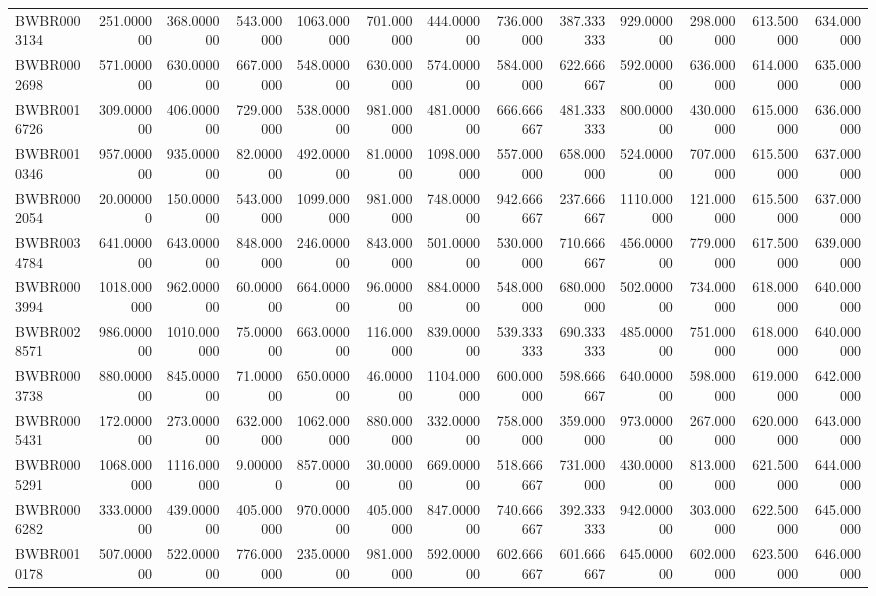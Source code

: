 \begin{longtable}{lrrrrrrrrrrrr}
BWBR0003134 & 251.000000 & 368.000000 & 543.000000 & 1063.000000 & 701.000000 & 444.000000 & 736.000000 & 387.333333 & 929.000000 & 298.000000 & 613.500000 & 634.000000 \\
BWBR0002698 & 571.000000 & 630.000000 & 667.000000 & 548.000000 & 630.000000 & 574.000000 & 584.000000 & 622.666667 & 592.000000 & 636.000000 & 614.000000 & 635.000000 \\
BWBR0016726 & 309.000000 & 406.000000 & 729.000000 & 538.000000 & 981.000000 & 481.000000 & 666.666667 & 481.333333 & 800.000000 & 430.000000 & 615.000000 & 636.000000 \\
BWBR0010346 & 957.000000 & 935.000000 & 82.000000 & 492.000000 & 81.000000 & 1098.000000 & 557.000000 & 658.000000 & 524.000000 & 707.000000 & 615.500000 & 637.000000 \\
BWBR0002054 & 20.000000 & 150.000000 & 543.000000 & 1099.000000 & 981.000000 & 748.000000 & 942.666667 & 237.666667 & 1110.000000 & 121.000000 & 615.500000 & 637.000000 \\
BWBR0034784 & 641.000000 & 643.000000 & 848.000000 & 246.000000 & 843.000000 & 501.000000 & 530.000000 & 710.666667 & 456.000000 & 779.000000 & 617.500000 & 639.000000 \\
BWBR0003994 & 1018.000000 & 962.000000 & 60.000000 & 664.000000 & 96.000000 & 884.000000 & 548.000000 & 680.000000 & 502.000000 & 734.000000 & 618.000000 & 640.000000 \\
BWBR0028571 & 986.000000 & 1010.000000 & 75.000000 & 663.000000 & 116.000000 & 839.000000 & 539.333333 & 690.333333 & 485.000000 & 751.000000 & 618.000000 & 640.000000 \\
BWBR0003738 & 880.000000 & 845.000000 & 71.000000 & 650.000000 & 46.000000 & 1104.000000 & 600.000000 & 598.666667 & 640.000000 & 598.000000 & 619.000000 & 642.000000 \\
BWBR0005431 & 172.000000 & 273.000000 & 632.000000 & 1062.000000 & 880.000000 & 332.000000 & 758.000000 & 359.000000 & 973.000000 & 267.000000 & 620.000000 & 643.000000 \\
BWBR0005291 & 1068.000000 & 1116.000000 & 9.000000 & 857.000000 & 30.000000 & 669.000000 & 518.666667 & 731.000000 & 430.000000 & 813.000000 & 621.500000 & 644.000000 \\
BWBR0006282 & 333.000000 & 439.000000 & 405.000000 & 970.000000 & 405.000000 & 847.000000 & 740.666667 & 392.333333 & 942.000000 & 303.000000 & 622.500000 & 645.000000 \\
BWBR0010178 & 507.000000 & 522.000000 & 776.000000 & 235.000000 & 981.000000 & 592.000000 & 602.666667 & 601.666667 & 645.000000 & 602.000000 & 623.500000 & 646.000000 \\

\end{longtable}
